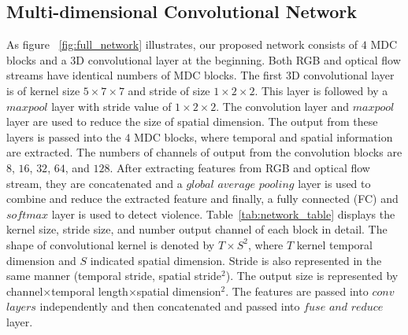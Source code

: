     
    
    \subsection{Multi-dimensional Convolutional Network}
   As figure ~\ref{fig:full_network} illustrates, our proposed network consists of $ 4 $ MDC blocks and a 3D convolutional layer at the beginning. 
   Both RGB and optical flow streams have identical numbers of MDC blocks.
   The first 3D convolutional layer is of kernel size $ {5}\times{7}\times{7} $ and stride of size $ {1}\times{2}\times{2} $.
   This layer is followed by a $ maxpool $ layer with stride value of $ {1}\times{2}\times{2} $.
   The convolution layer and $maxpool$ layer are used to reduce the size of spatial dimension.
   The output from these layers is passed into the $ 4 $ MDC blocks, where temporal and spatial information are extracted.
   The numbers of channels of output from the convolution blocks are $8$, $16$, $32$, $64$, and $128$.
   After extracting features from RGB and optical flow stream, they are concatenated and a $global$ $average$ $pooling$ layer is used to combine and reduce the extracted feature and finally, a fully connected (FC) and $softmax$ layer is used to detect violence.
   Table~\ref{tab:network_table} displays the kernel size, stride size, and number output channel of each block in detail.
   The shape of convolutional kernel is denoted by $ {T}\times{S}^2 $, where $T$ kernel temporal dimension and $S$ indicated spatial dimension. Stride is also represented in the same manner (temporal stride, spatial stride$^2$). The output size is represented by channel$\times$temporal length$\times$spatial dimension$^2$. The features are passed into $conv$ $layers$ independently and then concatenated and passed into $fuse$ $and$ $reduce$ layer.
   
   
   	
	
 
